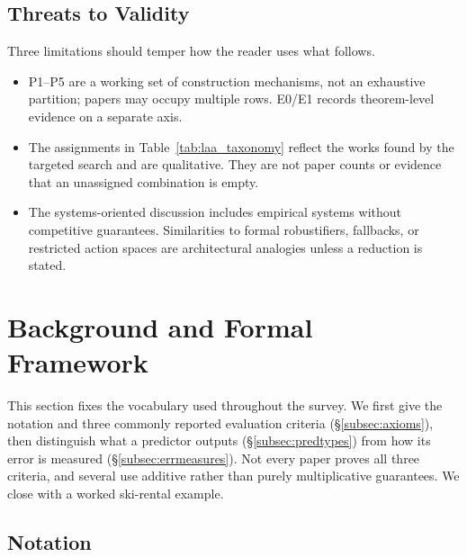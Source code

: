 \documentclass[acmsmall,screen,nonacm]{acmart}
\theoremstyle{acmdefinition}%
\begin{document}
\subsection{Threats to Validity}
\label{subsec:threats}

Three limitations should temper how the reader uses what follows.
\begin{itemize}
  \item P1--P5 are a working set of construction mechanisms, not an exhaustive partition; papers may occupy multiple rows. E0/E1 records theorem-level evidence on a separate axis.
  \item The assignments in Table~\ref{tab:laa_taxonomy} reflect the works found by the targeted search and are qualitative. They are not paper counts or evidence that an unassigned combination is empty.
  \item The systems-oriented discussion includes empirical systems without competitive guarantees. Similarities to formal robustifiers, fallbacks, or restricted action spaces are architectural analogies unless a reduction is stated.

\end{itemize}


%
\section{Background and Formal Framework}
\label{sec:framework}

This section fixes the vocabulary used throughout the survey. We first give the notation and three commonly reported evaluation criteria (\S\ref{subsec:axioms}), then distinguish what a predictor outputs (\S\ref{subsec:predtypes}) from how its error is measured (\S\ref{subsec:errmeasures}). Not every paper proves all three criteria, and several use additive rather than purely multiplicative guarantees. We close with a worked ski-rental example.

\subsection{Notation}
\label{subsec:notation}
\end{document}
